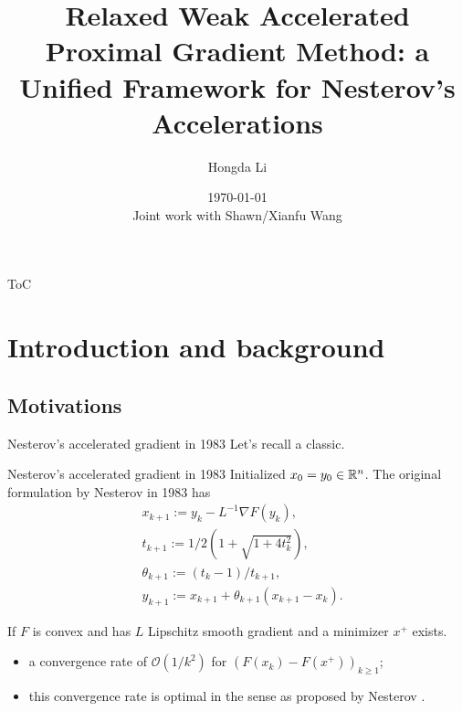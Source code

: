 \documentclass[11pt]{beamer}
\author[Hongda Li]{Hongda Li}
\title{
    Relaxed Weak Accelerated Proximal Gradient Method: a Unified Framework for Nesterov's Accelerations
}
\institute[UBCO]{
    University of British Columbia Okanagan
}
\date[\today]{\today \\ \vspace{1cm} \tiny{Joint work with Shawn/Xianfu Wang}}
\theoremstyle{definition}
\begin{document}
\begin{frame}
    \titlepage
\end{frame}

\begin{frame}{ToC}
    \tableofcontents
\end{frame}

\section{Introduction and background}
    \subsection{Motivations}
        \begin{frame}{Nesterov's accelerated gradient in 1983}
            Let's recall a classic. 
            \begin{block}{Nesterov's accelerated gradient in 1983}
                Initialized $x_0 = y_0 \in \mathbb R^n$. 
                The original formulation by Nesterov in 1983 \cite{nesterov_method_1983} has
                {\small
                \begin{align*}
                    & x_{k + 1} := y_k - L^{-1}\nabla F(y_k),
                    \\
                    & t_{k + 1} := 1/2\left(1 + \sqrt{1 + 4t_{k}^2}\right),
                    \\
                    & \theta_{k + 1} := (t_{k} - 1)/t_{k + 1}, \label{eqn:example-algorithm}
                    \\
                    & y_{k + 1} := x_{k + 1} + \theta_{k + 1}(x_{k + 1} - x_k).
                \end{align*}    
                }
            \end{block}
            If $F$ is convex and has $L$ Lipschitz smooth gradient and a minimizer $x^+$ exists. 
            \begin{itemize}
                \item a convergence rate of $\mathcal O(1/k^2)$ for $(F(x_k) - F(x^+))_{k \ge 1}$;
                \item this convergence rate is optimal in the sense as proposed by Nesterov \cite{nesterov_lectures_2018}.
            \end{itemize}
        \end{frame}
\end{document}
